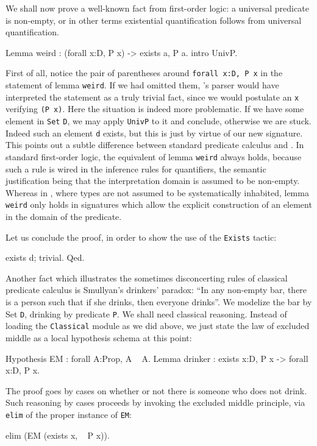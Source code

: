\documentclass[11pt,a4paper]{book}
\begin{document}
We shall now prove a well-known fact from first-order logic: a universal 
predicate is non-empty, or in other terms existential quantification 
follows from universal quantification.
\begin{coq_example}
Lemma weird : (forall x:D, P x) ->  exists a, P a.
 intro UnivP.
\end{coq_example}

First of all, notice the pair of parentheses around
\verb+forall x:D, P x+ in
the statement of lemma \verb:weird:.
If we had omitted them, \Coq's parser would have interpreted the
statement as a truly trivial fact, since we would 
postulate an \verb:x: verifying \verb:(P x):. Here the situation is indeed
more problematic. If we have some element in \verb:Set: \verb:D:, we may
apply \verb:UnivP: to it and conclude, otherwise we are stuck. Indeed
such an element \verb:d: exists, but this is just by virtue of our
new signature. This points out a subtle difference between standard
predicate calculus and \Coq. In standard first-order logic,
the equivalent of lemma \verb:weird: always holds, 
because such a rule is wired in the inference rules for quantifiers, the
semantic justification being that the interpretation domain is assumed to
be non-empty. Whereas in \Coq, where types are not assumed to be 
systematically inhabited, lemma \verb:weird: only holds in signatures
which allow the explicit construction of an element in the domain of
the predicate. 

Let us conclude the proof, in order to show the use of the \verb:Exists:
tactic:
\begin{coq_example}
exists d; trivial.
Qed.
\end{coq_example}

Another fact which illustrates the sometimes disconcerting rules of
classical 
predicate calculus is Smullyan's drinkers' paradox: ``In any non-empty
bar, there is a person such that if she drinks, then everyone drinks''.
We modelize the bar by Set \verb:D:, drinking by predicate \verb:P:.
We shall need classical reasoning. Instead of loading the \verb:Classical:
module as we did above, we just state the law of excluded middle as a
local hypothesis schema at this point:
\begin{coq_example}
Hypothesis EM : forall A:Prop, A \/ ~ A.
Lemma drinker :  exists x:D, P x -> forall x:D, P x.
\end{coq_example}
The proof goes by cases on whether or not
there is someone who does not drink. Such reasoning by cases proceeds
by invoking the excluded middle principle, via \verb:elim: of the
proper instance of \verb:EM::
\begin{coq_example}
elim (EM (exists x, ~ P x)).
\end{coq_example}
\end{document}
